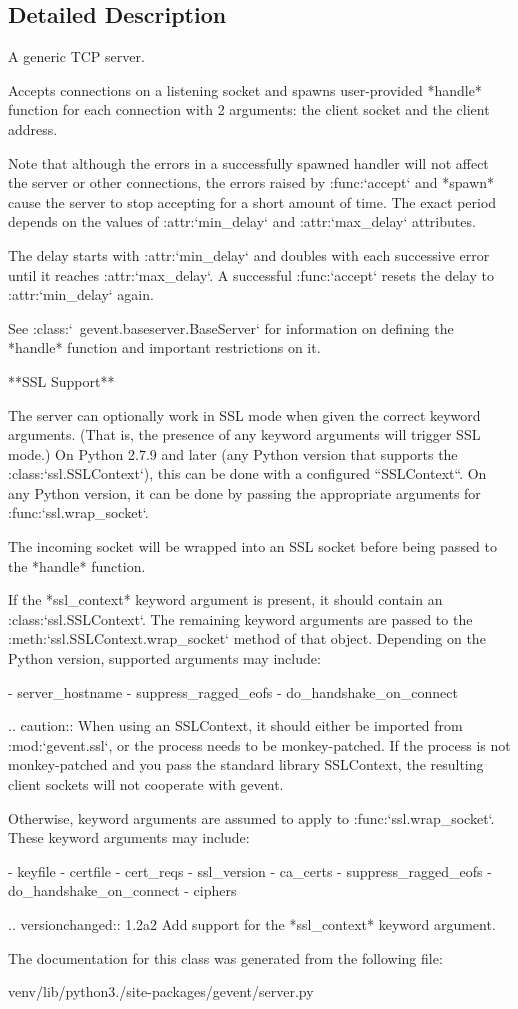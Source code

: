 \subsection{Detailed Description}
\begin{DoxyVerb}A generic TCP server.

Accepts connections on a listening socket and spawns user-provided
*handle* function for each connection with 2 arguments: the client
socket and the client address.

Note that although the errors in a successfully spawned handler
will not affect the server or other connections, the errors raised
by :func:`accept` and *spawn* cause the server to stop accepting
for a short amount of time. The exact period depends on the values
of :attr:`min_delay` and :attr:`max_delay` attributes.

The delay starts with :attr:`min_delay` and doubles with each
successive error until it reaches :attr:`max_delay`. A successful
:func:`accept` resets the delay to :attr:`min_delay` again.

See :class:`~gevent.baseserver.BaseServer` for information on defining the *handle*
function and important restrictions on it.

**SSL Support**

The server can optionally work in SSL mode when given the correct
keyword arguments. (That is, the presence of any keyword arguments
will trigger SSL mode.) On Python 2.7.9 and later (any Python
version that supports the :class:`ssl.SSLContext`), this can be
done with a configured ``SSLContext``. On any Python version, it
can be done by passing the appropriate arguments for
:func:`ssl.wrap_socket`.

The incoming socket will be wrapped into an SSL socket before
being passed to the *handle* function.

If the *ssl_context* keyword argument is present, it should
contain an :class:`ssl.SSLContext`. The remaining keyword
arguments are passed to the :meth:`ssl.SSLContext.wrap_socket`
method of that object. Depending on the Python version, supported arguments
may include:

- server_hostname
- suppress_ragged_eofs
- do_handshake_on_connect

.. caution:: When using an SSLContext, it should either be
   imported from :mod:`gevent.ssl`, or the process needs to be monkey-patched.
   If the process is not monkey-patched and you pass the standard library
   SSLContext, the resulting client sockets will not cooperate with gevent.

Otherwise, keyword arguments are assumed to apply to :func:`ssl.wrap_socket`.
These keyword arguments may include:

- keyfile
- certfile
- cert_reqs
- ssl_version
- ca_certs
- suppress_ragged_eofs
- do_handshake_on_connect
- ciphers

.. versionchanged:: 1.2a2
   Add support for the *ssl_context* keyword argument.\end{DoxyVerb}
 

The documentation for this class was generated from the following file\+:\begin{DoxyCompactItemize}
\item 
venv/lib/python3./site-\/packages/gevent/server.\+py\end{DoxyCompactItemize}
